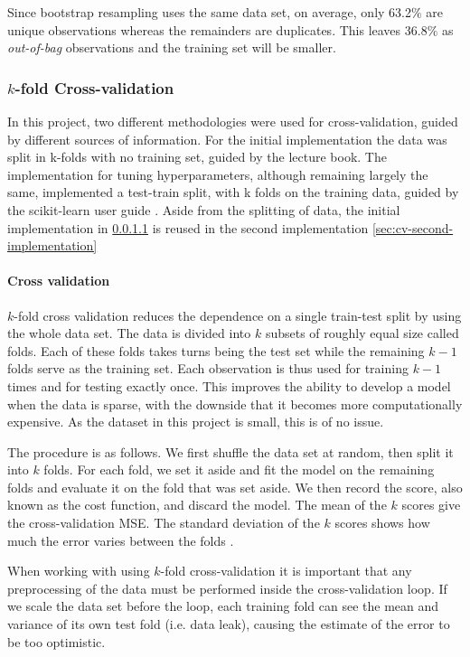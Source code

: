 \documentclass[reprint,english,notitlepage]{revtex4-2}  %
\begin{document}
Since bootstrap resampling uses the same data set, on average, only 63.2$\%$ are unique observations whereas the remainders are duplicates. This leaves 36.8$\%$ as \textit{out-of-bag} observations and the training set will be smaller.

\subsubsection{$k$-fold Cross-validation}
In this project, two different methodologies were used for cross-validation, guided by different sources of information. For the initial implementation the data was split in k-folds with no training set, guided by the lecture book\cite{lecture_book}. The implementation for tuning hyperparameters, although remaining largely the same, implemented a test-train split, with k folds on the training data, guided by the scikit-learn user guide \cite{scikitlearn-crossvalidation}. Aside from the splitting of data, the initial implementation in \ref{sec:cv-first-implementation} is reused in the second implementation \ref{sec:cv-second-implementation}\\

\paragraph{Cross validation}\label{sec:cv-first-implementation}
$k$-fold cross validation reduces the dependence on a single train-test split by using the whole data set. The data is divided into $k$ subsets of roughly equal size called folds. Each of these folds takes turns being the test set while the remaining $k-1$ folds serve as the training set. Each observation is thus used for training $k-1$ times and for testing exactly once. This improves the ability to develop a model when the data is sparse, with the downside that it becomes more computationally expensive. As the dataset in this project is small, this is of no issue. 

The procedure is as follows. We first shuffle the data set at random, then split it into $k$ folds. For each fold, we set it aside and fit the model on the remaining folds and evaluate it on the fold that was set aside. We then record the score, also known as the cost function, and discard the model. The mean of the $k$ scores give the cross-validation MSE. The standard deviation of the $k$ scores shows how much the error varies between the folds \cite{lecture_book}.

When working with using $k$-fold cross-validation it is important that any preprocessing of the data must be performed inside the cross-validation loop. If we scale the data set before the loop, each training fold can see the mean and variance of its own test fold (i.e. data leak), causing the estimate of the error to be too optimistic.\\
\end{document}
